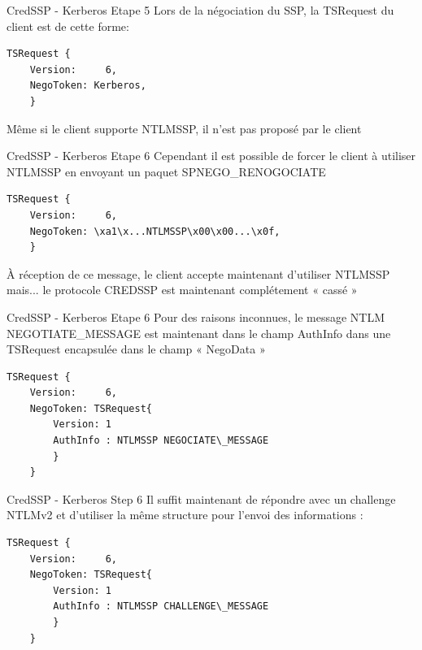 \documentclass{beamer}
\begin{document}
\begin{frame}[fragile]{CredSSP - Kerberos Etape 5}
Lors de la négociation du SSP, la TSRequest du client est de cette forme:
\begin{lstlisting}[frame=single,basicstyle=\tiny]
TSRequest {
	Version:     6,
	NegoToken: Kerberos,
	}
	\end{lstlisting}
	
Même si le client supporte NTLMSSP, il n'est pas proposé par le client
\end{frame}

\begin{frame}[fragile]{CredSSP - Kerberos Etape 6}
Cependant il est possible de forcer le client à utiliser NTLMSSP en envoyant un paquet SPNEGO\_RENOGOCIATE
\begin{lstlisting}[frame=single,basicstyle=\tiny]
TSRequest {
	Version:     6,
	NegoToken: \xa1\x...NTLMSSP\x00\x00...\x0f,
	}
	\end{lstlisting}
À réception de ce message, le client accepte maintenant d'utiliser NTLMSSP mais... le protocole CREDSSP est maintenant complétement « cassé »
\end{frame}

\begin{frame}[fragile]{CredSSP - Kerberos Etape 6}
Pour des raisons inconnues, le message NTLM NEGOTIATE\_MESSAGE est maintenant dans le champ AuthInfo dans une TSRequest encapsulée dans le champ « NegoData »
\begin{lstlisting}[frame=single,basicstyle=\tiny]
TSRequest {
	Version:     6,
	NegoToken: TSRequest{
		Version: 1
		AuthInfo : NTLMSSP NEGOCIATE\_MESSAGE
		}
	}
	\end{lstlisting}

\end{frame}

\begin{frame}[fragile]{CredSSP - Kerberos Step 6}
Il suffit maintenant de répondre avec un challenge NTLMv2 et d'utiliser la même structure pour l'envoi des informations :


\begin{lstlisting}[frame=single,basicstyle=\tiny]
TSRequest {
	Version:     6,
	NegoToken: TSRequest{
		Version: 1
		AuthInfo : NTLMSSP CHALLENGE\_MESSAGE
		}
	}
	\end{lstlisting}

\end{frame}
\end{document}
